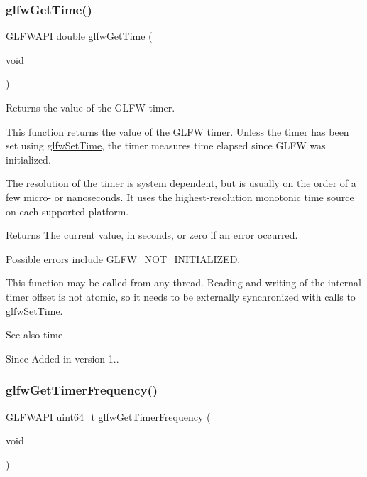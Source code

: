 \subsubsection{\texorpdfstring{glfw\+Get\+Time()}{glfwGetTime()}}
{\footnotesize\ttfamily G\+L\+F\+W\+A\+PI double glfw\+Get\+Time (\begin{DoxyParamCaption}\item[{void}]{ }\end{DoxyParamCaption})}



Returns the value of the G\+L\+FW timer. 

This function returns the value of the G\+L\+FW timer. Unless the timer has been set using \hyperlink{group__input_ga94360a3628a09f32708f83cc3fa48590}{glfw\+Set\+Time}, the timer measures time elapsed since G\+L\+FW was initialized.

The resolution of the timer is system dependent, but is usually on the order of a few micro-\/ or nanoseconds. It uses the highest-\/resolution monotonic time source on each supported platform.

\begin{DoxyReturn}{Returns}
The current value, in seconds, or zero if an error occurred.
\end{DoxyReturn}
Possible errors include \hyperlink{group__errors_ga2374ee02c177f12e1fa76ff3ed15e14a}{G\+L\+F\+W\+\_\+\+N\+O\+T\+\_\+\+I\+N\+I\+T\+I\+A\+L\+I\+Z\+ED}.

This function may be called from any thread. Reading and writing of the internal timer offset is not atomic, so it needs to be externally synchronized with calls to \hyperlink{group__input_ga94360a3628a09f32708f83cc3fa48590}{glfw\+Set\+Time}.

\begin{DoxySeeAlso}{See also}
time
\end{DoxySeeAlso}
\begin{DoxySince}{Since}
Added in version 1.. 
\end{DoxySince}
\mbox{\label{group__input_gaa92d10b10013372778efbf6367714371}} 
\subsubsection{\texorpdfstring{glfw\+Get\+Timer\+Frequency()}{glfwGetTimerFrequency()}}
{\footnotesize\ttfamily G\+L\+F\+W\+A\+PI uint64\+\_\+t glfw\+Get\+Timer\+Frequency (\begin{DoxyParamCaption}\item[{void}]{ }\end{DoxyParamCaption})}




